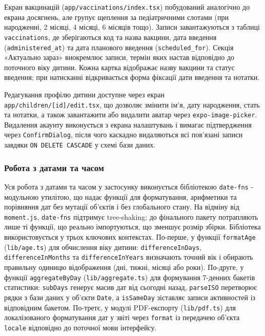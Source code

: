 Екран вакцинацій (\texttt{app/vaccinations/index.tsx}) побудований аналогічно до екрана досягнень, але групує щеплення за педіатричними слотами (при народженні, 2 місяці, 4 місяці, 6 місяців тощо). Записи завантажуються з таблиці \texttt{vaccinations}, де зберігаються код та назва вакцини, дата введення (\texttt{administered\_at}) та дата планового введення (\texttt{scheduled\_for}). Секція «Актуально зараз» виокремлює записи, термін яких настав відповідно до поточного віку дитини. Кожна картка відображає назву вакцини та статус введення; при натисканні відкривається форма фіксації дати введення та нотатки.

Редагування профілю дитини доступне через екран \texttt{app/children/[id]/edit.tsx}, що дозволяє змінити ім'я, дату народження, стать та нотатки, а також завантажити або видалити аватар через \texttt{expo-image-picker}. Видалення акаунту виконується з екрана налаштувань і вимагає підтвердження через \texttt{ConfirmDialog}, після чого каскадно видаляються всі пов'язані записи завдяки \texttt{ON DELETE CASCADE} у схемі бази даних.

\subsubsection{Робота з датами та часом}

Уся робота з датами та часом у застосунку виконується бібліотекою \texttt{date-fns} - модульною утилітою, що надає функції для форматування, арифметики та порівняння дат без мутації об'єктів і без глобального стану. На відміну від \texttt{moment.js}, \texttt{date-fns} підтримує tree-shaking: до фінального пакету потрапляють лише ті функції, що реально імпортуються, що зменшує розмір збірки. Бібліотека використовується у трьох ключових контекстах. По-перше, у функції \texttt{formatAge} (\texttt{lib/age.ts}) для обчислення віку дитини: \texttt{differenceInDays}, \texttt{differenceInMonths} та \texttt{differenceInYears} визначають точний вік і обирають правильну одиницю відображення (дні, тижні, місяці або роки). По-друге, у функції \texttt{aggregateByDay} (\texttt{lib/aggregate.ts}) для формування 7-денних бакетів статистики: \texttt{subDays} генерує масив дат від сьогодні назад, \texttt{parseISO} перетворює рядки з бази даних у об'єкти \texttt{Date}, а \texttt{isSameDay} зіставляє записи активностей із відповідним бакетом. По-третє, у модулі PDF-експорту (\texttt{lib/pdf.ts}) для локалізованого форматування дат у звіті через \texttt{format} із передачею об'єкта \texttt{locale} відповідно до поточної мови інтерфейсу.

